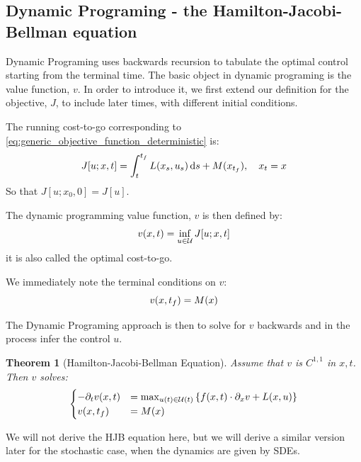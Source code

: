 \documentclass{article}
\newtheorem{thm}{Theorem}[section]
\begin{document}
\subsection{Dynamic Programing - the Hamilton-Jacobi-Bellman equation} 
Dynamic Programing uses backwards recursion to tabulate the optimal control
starting from the terminal time. The basic object in dynamic programing is the value function, $v$. In order to
introduce it, we first extend our definition for the objective, $J$, to include later
times, with different initial conditions. 

The running cost-to-go corresponding to
\cref{eq:generic_objective_function_deterministic} is:
\begin{equation}
J[u; x, t] = \int_t^{ t_f } L(x_s, u_s) \, \mathrm{d} s + M(x_{ t_f }), \quad x_t = x
\label{eq:generic_cost_to_go_deterministic} 
\end{equation}
So that $J[u; x_0, 0] = J[u]$. 

The dynamic programming value function, $v$ is then defined by:
$$
v(x,t) = \inf_{u \in { \mathcal{U} }} J[u; x,t] 
$$
it is also called the optimal cost-to-go. 

We immediately note the terminal conditions on $v$:
\begin{equation}
v(x,{ t_f } ) = M(x)
\end{equation}


The Dynamic Programing approach is then to solve for $v$ backwards and in the
process infer the control $u$.
\begin{thm}[Hamilton-Jacobi-Bellman Equation] Assume that $v$ is $C^{1,1}$ in
$x,t$. Then $v$ solves:
\begin{equation}
\begin{cases}
-{\partial}_t v(x,t) &= \max_{u(t) \in { \mathcal{U} }(t)} \left\{ f(x,t) \cdot {\partial}_x v +
L(x,u) \right\}
\\
v(x,{ t_f }) &= M(x)
\end{cases}
\end{equation}
\end{thm}
We will not derive the HJB equation here, but we will derive a similar version
later for the stochastic case, when the dynamics are given by SDEs. 

\end{document}
